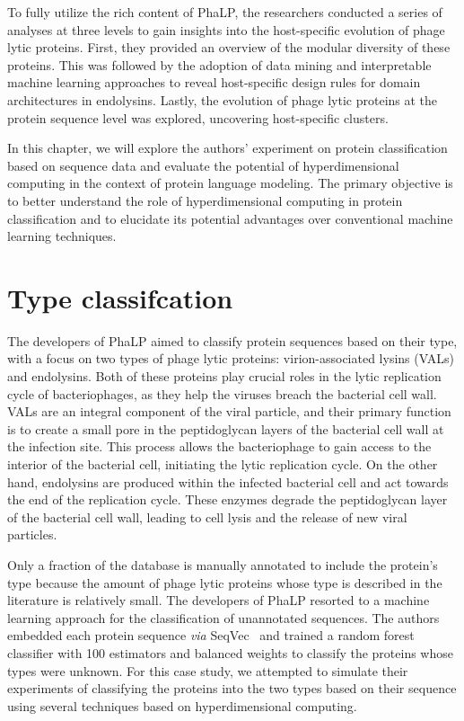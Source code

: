 To fully utilize the rich content of PhaLP, the researchers conducted a series of analyses at three levels to gain insights into the host-specific evolution of phage lytic proteins. First, they provided an overview of the modular diversity of these proteins. This was followed by the adoption of data mining and interpretable machine learning approaches to reveal host-specific design rules for domain architectures in endolysins. Lastly, the evolution of phage lytic proteins at the protein sequence level was explored, uncovering host-specific clusters.

In this chapter, we will explore the authors' experiment on protein classification based on sequence data and evaluate the potential of hyperdimensional computing in the context of protein language modeling. The primary objective is to better understand the role of hyperdimensional computing in protein classification and to elucidate its potential advantages over conventional machine learning techniques.

\section{Type classifcation}
The developers of PhaLP aimed to classify protein sequences based on their type, with a focus on two types of phage lytic proteins: virion-associated lysins (VALs) and endolysins. Both of these proteins play crucial roles in the lytic replication cycle of bacteriophages, as they help the viruses breach the bacterial cell wall. VALs are an integral component of the viral particle, and their primary function is to create a small pore in the peptidoglycan layers of the bacterial cell wall at the infection site. This process allows the bacteriophage to gain access to the interior of the bacterial cell, initiating the lytic replication cycle. On the other hand, endolysins are produced within the infected bacterial cell and act towards the end of the replication cycle. These enzymes degrade the peptidoglycan layer of the bacterial cell wall, leading to cell lysis and the release of new viral particles.

Only a fraction of the database is manually annotated to include the protein's type because the amount of phage lytic proteins whose type is described in the literature is relatively small. The developers of PhaLP resorted to a machine learning approach for the classification of unannotated sequences. The authors embedded each protein sequence \textit{via} SeqVec~\cite{seqvec} and trained a random forest classifier with 100 estimators and balanced weights to classify the proteins whose types were unknown. For this case study, we attempted to simulate their experiments of classifying the proteins into the two types based on their sequence using several techniques based on hyperdimensional computing.

